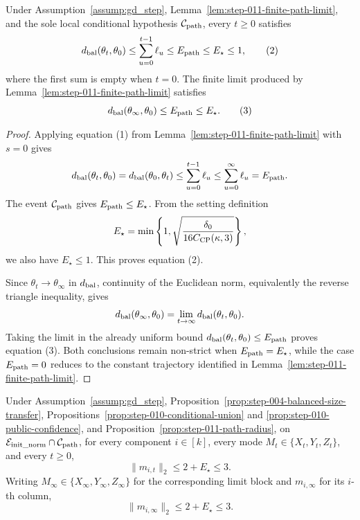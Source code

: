 \begin{proposition}
\label{prop:step-011-path-radius}
\leavevmode\par\noindent
Under Assumption~\ref{assump:gd_step},
Lemma~\ref{lem:step-011-finite-path-limit}, and the sole local conditional
hypothesis \(\mathcal C_{\rm path}\), every \(t\ge0\) satisfies
\[
  d_{\rm bal}(\theta_t,\theta_0)
  \le\sum_{u=0}^{t-1}\ell_u
  \le E_{\rm path}
  \le E_\star
  \le1,                                                  \tag{2}
\]
where the first sum is empty when \(t=0\). The finite limit produced by
Lemma~\ref{lem:step-011-finite-path-limit} satisfies
\[
  d_{\rm bal}(\theta_\infty,\theta_0)
  \le E_{\rm path}
  \le E_\star.                                          \tag{3}
\]

\end{proposition}

\begin{proof}
Applying equation (1) from
Lemma~\ref{lem:step-011-finite-path-limit} with \(s=0\) gives
\[
  d_{\rm bal}(\theta_t,\theta_0)
  =d_{\rm bal}(\theta_0,\theta_t)
  \le\sum_{u=0}^{t-1}\ell_u
  \le\sum_{u=0}^{\infty}\ell_u
  =E_{\rm path}.
\]
The event \(\mathcal C_{\rm path}\) gives
\(E_{\rm path}\le E_\star\). From the setting definition
\[
  E_\star
  =\min\left\{1,
    \sqrt{\frac{\delta_0}{16C_{\rm CP}(\kappa,3)}}\right\},
\]
we also have \(E_\star\le1\). This proves equation (2).

Since \(\theta_t\to\theta_\infty\) in \(d_{\rm bal}\), continuity of the
Euclidean norm, equivalently the reverse triangle inequality, gives
\[
  d_{\rm bal}(\theta_\infty,\theta_0)
  =\lim_{t\to\infty}d_{\rm bal}(\theta_t,\theta_0).
\]
Taking the limit in the already uniform bound
\(d_{\rm bal}(\theta_t,\theta_0)\le E_{\rm path}\) proves equation (3).
Both conclusions remain non-strict when \(E_{\rm path}=E_\star\), while the
case \(E_{\rm path}=0\) reduces to the constant trajectory identified in
Lemma~\ref{lem:step-011-finite-path-limit}. 

\end{proof}


\begin{proposition}
\label{prop:step-011-uniform-factor-radius}
Under Assumption~\ref{assump:gd_step}, Proposition~\ref{prop:step-004-balanced-size-transfer}, Propositions~\ref{prop:step-010-conditional-union} and
\ref{prop:step-010-public-confidence}, and
Proposition~\ref{prop:step-011-path-radius}, on
\(\mathcal E_{\rm init\_norm}\cap\mathcal C_{\rm path}\), for every
component \(i\in[k]\), every mode
\(M_t\in\{X_t,Y_t,Z_t\}\), and every \(t\ge0\),
\[
  \|m_{i,t}\|_2\le2+E_\star\le3.                       \tag{4}
\]
Writing \(M_\infty\in\{X_\infty,Y_\infty,Z_\infty\}\) for the
corresponding limit block and \(m_{i,\infty}\) for its \(i\)-th column,
\[
  \|m_{i,\infty}\|_2\le2+E_\star\le3.                 \tag{5}
\]

\end{proposition}

